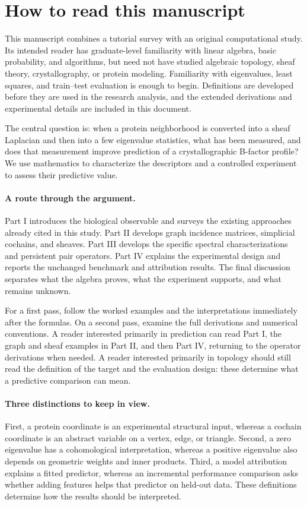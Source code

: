 \section*{How to read this manuscript}
This manuscript combines a tutorial survey with an original computational study. Its intended reader has graduate-level familiarity with linear algebra, basic probability, and algorithms, but need not have studied algebraic topology, sheaf theory, crystallography, or protein modeling. Familiarity with eigenvalues, least squares, and train--test evaluation is enough to begin. Definitions are developed before they are used in the research analysis, and the extended derivations and experimental details are included in this document.

The central question is: when a protein neighborhood is converted into a sheaf Laplacian and then into a few eigenvalue statistics, what has been measured, and does that measurement improve prediction of a crystallographic B-factor profile? We use mathematics to characterize the descriptors and a controlled experiment to assess their predictive value.

\paragraph{A route through the argument.}
Part I introduces the biological observable and surveys the existing approaches already cited in this study. Part II develops graph incidence matrices, simplicial cochains, and sheaves. Part III develops the specific spectral characterizations and persistent pair operators. Part IV explains the experimental design and reports the unchanged benchmark and attribution results. The final discussion separates what the algebra proves, what the experiment supports, and what remains unknown.

For a first pass, follow the worked examples and the interpretations immediately after the formulas. On a second pass, examine the full derivations and numerical conventions. A reader interested primarily in prediction can read Part I, the graph and sheaf examples in Part II, and then Part IV, returning to the operator derivations when needed. A reader interested primarily in topology should still read the definition of the target and the evaluation design: these determine what a predictive comparison can mean.

\paragraph{Three distinctions to keep in view.}
First, a protein coordinate is an experimental structural input, whereas a cochain coordinate is an abstract variable on a vertex, edge, or triangle. Second, a zero eigenvalue has a cohomological interpretation, whereas a positive eigenvalue also depends on geometric weights and inner products. Third, a model attribution explains a fitted predictor, whereas an incremental performance comparison asks whether adding features helps that predictor on held-out data. These definitions determine how the results should be interpreted.

